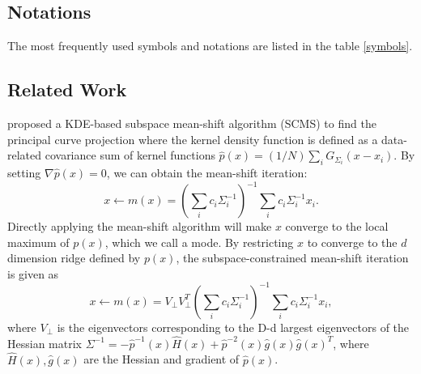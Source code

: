 \documentclass[aos,preprint]{imsart}
\theoremstyle{remark}
\begin{document}
\subsection{Notations}
The most frequently used symbols and notations are listed in the table \ref{symbols}.

\begin{table}[h]\label{symbols}
\caption{Symbols and Notations}
\end{table}


\subsection{Related Work}
\cite{ozertem2011locally} proposed a KDE-based subspace mean-shift algorithm (SCMS) to find the principal curve projection where the kernel density function is defined as a data-related covariance sum of kernel functions $\hat{p}(x) = (1/N)\sum_i G_{\Sigma_i}(x -x_i) $. By setting $\nabla \hat{p}(x) = 0$, we can obtain the mean-shift iteration: 
\[
x\leftarrow m(x) = (\sum_i c_i \Sigma_i^{-1} )^{-1} \sum_i c_i \Sigma_i^{-1}x_i.
\]
Directly applying the mean-shift algorithm will make $x$ converge to the local maximum of $p(x)$, which we call a mode. By restricting $x$ to converge to the $d$ dimension ridge defined by $p(x)$, the subspace-constrained mean-shift iteration \cite{ozertem2011locally} is given as
\[
x\leftarrow m(x) =V_{\perp} V_{\perp}^T (\sum_i c_i \Sigma_i^{-1} )^{-1} \sum_i c_i \Sigma_i^{-1}x_i,
\]
where $V_{\perp}$ is the eigenvectors corresponding to the D-d largest eigenvectors of the Hessian matrix $\Sigma^{-1} = -\hat{p}^{-1}(x)\hat{H}(x)+\hat{p}^{-2}(x)\hat{g}(x)\hat{g}(x)^T$, where $\hat{H}(x), \hat{g}(x)$ are the Hessian and gradient of $\hat{p}(x)$.
\end{document}
